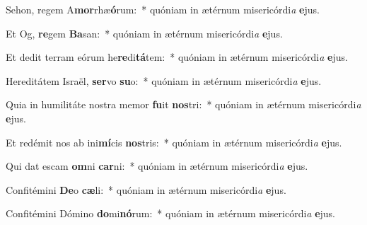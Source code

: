 \item Sehon, regem A\textbf{mor}rhæ\textbf{ó}rum:~* quóniam in ætérnum misericórdi\textit{a} \textbf{e}jus.
\item Et Og, \textbf{re}gem \textbf{Ba}san:~* quóniam in ætérnum misericórdi\textit{a} \textbf{e}jus.
\item Et dedit terram eórum he\textbf{re}di\textbf{tá}tem:~* quóniam in ætérnum misericórdi\textit{a} \textbf{e}jus.
\item Hereditátem Israël, \textbf{ser}vo \textbf{su}o:~* quóniam in ætérnum misericórdi\textit{a} \textbf{e}jus.
\item Quia in humilitáte nostra memor \textbf{fu}it \textbf{nos}tri:~* quóniam in ætérnum misericórdi\textit{a} \textbf{e}jus.
\item Et redémit nos ab ini\textbf{mí}cis \textbf{nos}tris:~* quóniam in ætérnum misericórdi\textit{a} \textbf{e}jus.
\item Qui dat escam \textbf{om}ni \textbf{car}ni:~* quóniam in ætérnum misericórdi\textit{a} \textbf{e}jus.
\item Confitémini \textbf{De}o \textbf{cæ}li:~* quóniam in ætérnum misericórdi\textit{a} \textbf{e}jus.
\item Confitémini Dómino \textbf{do}mi\textbf{nó}rum:~* quóniam in ætérnum misericórdi\textit{a} \textbf{e}jus.
